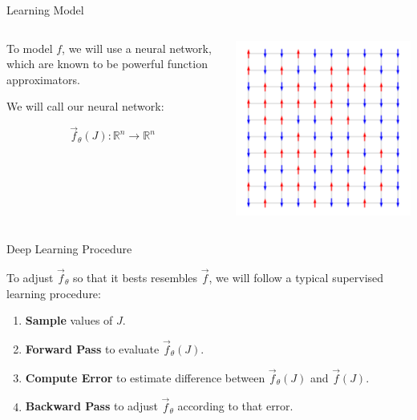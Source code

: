 \documentclass[aspectratio=169, 12pt]{beamer}
\begin{document}
\begin{frame}{Learning Model}


    \begin{columns}
        \begin{column}{.6\textwidth}
            
            To model $f$, we will use a neural network, which are known to be powerful function approximators. 

            We will call our neural network:

            \[
            \vec{f}_\theta(J) : \mathbb{R}^n \rightarrow \mathbb{R}^n
            \]
            
        \end{column}
        \begin{column}{.4\textwidth}
            \includegraphics[width=\textwidth]{images/ising-spins-grid.png}
        \end{column}
    \end{columns}
    
\end{frame}

\begin{frame}{Deep Learning Procedure}

    To adjust $\vec{f}_\theta$ so that it bests resembles $\vec{f}$, we will follow a typical supervised learning procedure:
    \begin{enumerate}
        \item \textbf{Sample} values of $J$. 
        \item \textbf{Forward Pass} to evaluate $\vec{f}_\theta(J)$. 
        \item \textbf{Compute Error} to estimate difference between $\vec{f}_\theta(J)$ and $\vec{f}(J)$. 
        \item \textbf{Backward Pass} to adjust $\vec{f}_\theta$ according to that error. 
    \end{enumerate}

\end{frame}
\end{document}
